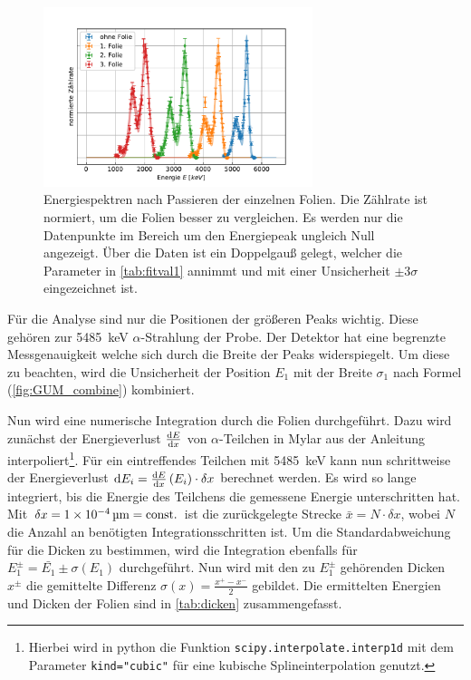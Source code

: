 \begin{figure}[ht]
	\centering
	\includegraphics[width=0.7\textwidth]{dat/m3_foliendicke.pdf}
	\caption{Energiespektren nach Passieren der einzelnen Folien.
			Die Zählrate ist normiert, um die Folien besser zu vergleichen.
			Es werden nur die Datenpunkte im Bereich um den Energiepeak ungleich Null angezeigt.
			Über die Daten ist ein Doppelgauß gelegt, welcher die Parameter in \cref{tab:fitval1} annimmt und mit einer Unsicherheit $\pm 3 \sigma$ eingezeichnet ist.}
	\label{fig:foliendicke}
\end{figure}

Für die Analyse sind nur die Positionen der größeren Peaks wichtig.
Diese gehören zur \SI{5485}{\kilo\electronvolt} $\alpha$-Strahlung der Probe.
Der Detektor hat eine begrenzte Messgenauigkeit welche sich durch die Breite der Peaks widerspiegelt.
Um diese zu beachten, wird die Unsicherheit der Position $E_1$ mit der Breite $\sigma_1$ nach Formel (\ref{fig:GUM_combine}) kombiniert.

Nun wird eine numerische Integration durch die Folien durchgeführt.
Dazu wird zunächst der Energieverlust $\dv{E}{x}$ von $\alpha$-Teilchen in Mylar aus der Anleitung interpoliert\footnote{Hierbei wird in python die Funktion \texttt{scipy.interpolate.interp1d} mit dem Parameter \texttt{kind="cubic"} für eine kubische Splineinterpolation genutzt.}.
Für ein eintreffendes Teilchen mit \SI{5485}{\kilo\electronvolt} kann nun schrittweise der Energieverlust $\dd E_i = \dv{E}{x} \left(E_i\right) \cdot \delta x$ berechnet werden.
Es wird so lange integriert, bis die Energie des Teilchens die gemessene Energie unterschritten hat.
Mit $\delta x = \SI{1e-4}{\micro\meter} = \text{const.}$ ist die zurückgelegte Strecke $\bar{x} = N \cdot \delta x$, wobei $N$ die Anzahl an benötigten Integrationsschritten ist.
Um die Standardabweichung für die Dicken zu bestimmen, wird die Integration ebenfalls für $E_1^\pm = \bar{E_1} \pm \sigma(E_1)$ durchgeführt.
Nun wird mit den zu $E_1^\pm$ gehörenden Dicken $x^\pm$ die gemittelte Differenz $\sigma(x) = \frac{x^+ - x^-}{2}$ gebildet.
Die ermittelten Energien und Dicken der Folien sind in \cref{tab:dicken} zusammengefasst.

